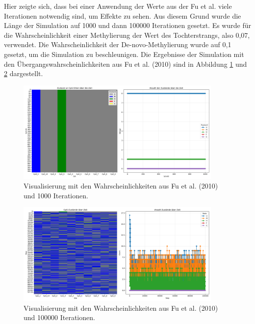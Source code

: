 \documentclass{SeminarV2}
\begin{document}
Hier zeigte sich, dass bei einer Anwendung der Werte aus der Fu et al. viele Iterationen notwendig sind, um Effekte zu sehen.
Aus diesem Grund wurde die Länge der Simulation auf 1000 und dann 100000 Iterationen gesetzt. Es wurde für die Wahrscheinlichkeit einer Methylierung der Wert des Tochterstrangs,
also 0,07, verwendet. Die Wahrscheinlichkeit der De-novo-Methylierung wurde auf 0,1 gesetzt, um die Simulation zu beschleunigen. Die Ergebnisse der Simulation mit den \"{U}bergangswahrscheinlichkeiten aus Fu et al. (2010) sind in Abbildung \ref{fig:cpg_states_1000} und \ref{fig:cpg_states_fu_100000} dargestellt.
\begin{figure}[htbp]
  \centering
  \includegraphics[width=0.9\textwidth]{images/cpg_states_plot_fu_1000.png}
  \caption{Visualisierung mit den Wahrscheinlichkeiten aus Fu et al. (2010) und 1000 Iterationen. \cite{fu-2010}}
  \label{fig:cpg_states_1000}
\end{figure}

\begin{figure}[htbp]
  \centering
  \includegraphics[width=0.9\textwidth]{images/cpg_states_plot_fu_100000.png}
  \caption{Visualisierung mit den Wahrscheinlichkeiten aus Fu et al. (2010) und 100000 Iterationen. \cite{fu-2010}}
  \label{fig:cpg_states_fu_100000}
\end{figure}
\end{document}
